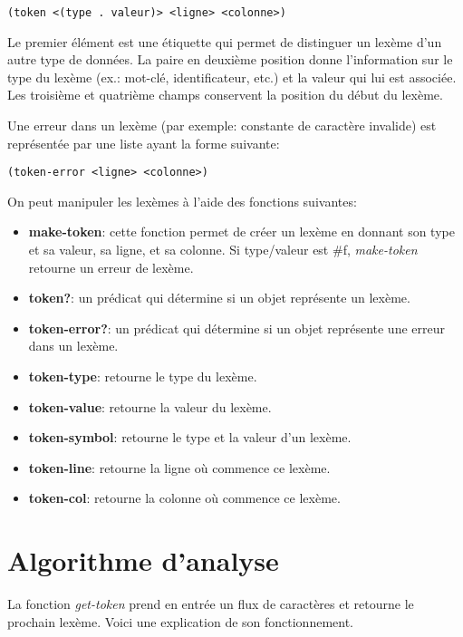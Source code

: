 \documentclass[11pt]{report}
\begin{document}
\begin{verbatim}
(token <(type . valeur)> <ligne> <colonne>)
\end{verbatim}

Le premier élément est une étiquette qui permet de distinguer un
lexème d'un autre type de données.  La paire en deuxième position
donne l'information sur le type du lexème (ex.: mot-clé,
identificateur, etc.) et la valeur qui lui est associée.  Les
troisième et quatrième champs conservent la position du début du
lexème.

Une erreur dans un lexème (par exemple: constante de caractère
invalide) est représentée par une liste ayant la forme suivante:

\begin{verbatim}
(token-error <ligne> <colonne>)
\end{verbatim}


On peut manipuler les lexèmes à l'aide des fonctions suivantes:

\begin{itemize}
\item {\bf make-token}: cette fonction permet de créer un lexème en
  donnant son type et sa valeur, sa ligne, et sa colonne.  Si
  type/valeur est \#f, \emph{make-token} retourne un erreur de lexème.
\item {\bf token?}: un prédicat qui détermine si un objet représente
  un lexème.
\item {\bf token-error?}: un prédicat qui détermine si un objet
  représente une erreur dans un lexème.
\item {\bf token-type}: retourne le type du lexème.
\item {\bf token-value}: retourne la valeur du lexème.
\item {\bf token-symbol}: retourne le type et la valeur d'un lexème.
\item {\bf token-line}: retourne la ligne où commence ce lexème.
\item {\bf token-col}: retourne la colonne où commence ce lexème.
\end{itemize}

\section{Algorithme d'analyse}

La fonction \emph{get-token} prend en entrée un flux de caractères et
retourne le prochain lexème.  Voici une explication de son
fonctionnement.
\end{document}
